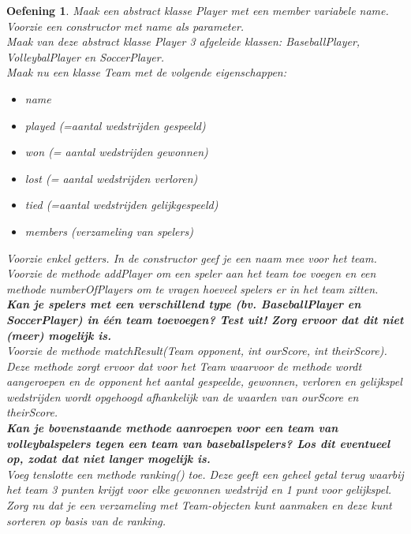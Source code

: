 \documentclass{tstextbook}
\newtheorem{envoefening}{Oefening}[chapter]
\newenvironment{oefening}
               {\begin{boxexercise}\begin{envoefening}}
               {\end{envoefening}\end{boxexercise}}
\begin{document}
\begin{oefening}
Maak een abstract klasse Player met een member variabele name. Voorzie een constructor met name als parameter. 
\\

Maak van deze abstract klasse Player 3 afgeleide klassen: BaseballPlayer, VolleybalPlayer en SoccerPlayer.
\\

Maak nu een klasse Team met de volgende eigenschappen: 
\begin{itemize}
\item name
\item played (=aantal wedstrijden gespeeld)
\item won (= aantal wedstrijden gewonnen)
\item lost (= aantal wedstrijden verloren)
\item tied (=aantal wedstrijden gelijkgespeeld) 
\item members (verzameling van spelers)
\end{itemize}
Voorzie enkel getters. In de constructor geef je  een naam mee voor het team.
\\

Voorzie de methode addPlayer om een speler aan het team toe voegen en een methode
numberOfPlayers om te vragen hoeveel spelers er in het team zitten.
\\

\textbf{Kan je spelers met een verschillend type (bv. BaseballPlayer en SoccerPlayer) in één team
toevoegen? Test uit! Zorg ervoor dat dit niet (meer) mogelijk is.}
\\

Voorzie de methode matchResult(Team opponent, int ourScore, int theirScore). Deze methode zorgt ervoor dat voor het Team waarvoor de methode wordt aangeroepen en de opponent het aantal gespeelde, gewonnen, verloren en gelijkspel wedstrijden wordt opgehoogd afhankelijk van de waarden van ourScore en theirScore.
\\

\textbf{Kan je bovenstaande methode aanroepen voor een team van volleybalspelers tegen een team van baseballspelers? Los dit eventueel op, zodat dat niet langer mogelijk is.}
\\

Voeg tenslotte een methode ranking() toe. Deze geeft een geheel getal terug waarbij het team 3 punten krijgt voor elke gewonnen wedstrijd en 1 punt voor gelijkspel.
Zorg nu dat je een verzameling met Team-objecten kunt aanmaken en deze kunt sorteren op basis van de ranking.
\end{oefening}
\end{document}
